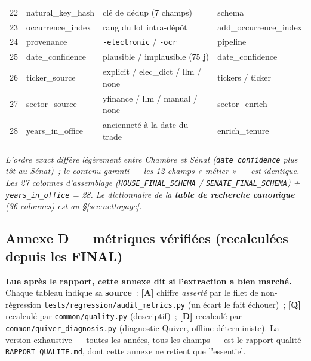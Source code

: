 \documentclass[11pt,a4paper]{article}
\newcommand{\co}[1]{\texttt{\small #1}}
\begin{document}
{\begin{longtable}{r >{\ttfamily}p{3.3cm} p{8.2cm} >{\ttfamily\scriptsize}p{3.0cm}}
22 & natural_key_hash & clé de dédup (7 champs) & schema \\
23 & occurrence_index & rang du lot intra-dépôt & add_occurrence_index \\
24 & provenance & \co{*-electronic} / \co{*-ocr} & pipeline \\
25 & date_confidence & plausible / implausible (75 j) & date_confidence \\
26 & ticker_source & explicit / elec\_dict / llm / none & tickers / ticker \\
27 & sector_source & yfinance / llm / manual / none & sector_enrich \\
28 & years_in_office & ancienneté à la date du trade & enrich_tenure \\
\bottomrule
\end{longtable}}
\textit{L'ordre exact diffère légèrement entre Chambre et Sénat (\co{date_confidence} plus tôt au
Sénat)~; le contenu garanti — les 12 champs « métier » — est identique. Les 27 colonnes d'assemblage
(\co{HOUSE_FINAL_SCHEMA} / \co{SENATE_FINAL_SCHEMA}) + \co{years_in_office} = 28. Le dictionnaire de la
\textbf{table de recherche canonique} (36 colonnes) est au \S{}\ref{sec:nettoyage}.}

\subsection{Annexe D — métriques vérifiées (recalculées depuis les FINAL)}
\label{anx:metrics}
\textbf{Lue après le rapport, cette annexe dit si l'extraction a bien marché.} Chaque tableau indique sa
\textbf{source}~: \textbf{[A]} chiffre \emph{asserté} par le filet de non-régression
\co{tests/regression/audit_metrics.py} (un écart le fait échouer)~; \textbf{[Q]} recalculé par
\co{common/quality.py} (descriptif)~; \textbf{[D]} recalculé par \co{common/quiver_diagnosis.py}
(diagnostic Quiver, offline déterministe). La version exhaustive — toutes les années, tous les champs —
est le rapport qualité \co{RAPPORT_QUALITE.md}, dont cette annexe ne retient que l'essentiel.
\end{document}
